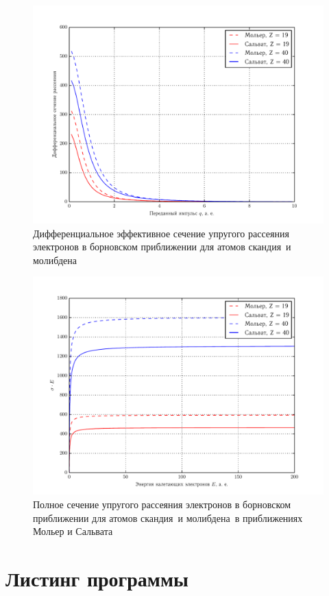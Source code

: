 \documentclass[10pt,pscyr]{hedlab}
\newcommand{\fiat}{скандия~}
\newcommand{\seat}{молибдена~}
\begin{document}
  \begin{figure}[h!]
    \centering
    \includegraphics[width=.7\textwidth]{diffsect}
    \caption{Дифференциальное эффективное сечение упругого
      рассеяния электронов в борновском приближении для атомов
      \fiat и \seat}
    \label{fig:diff}
  \end{figure}
  
  \begin{figure}[h!]
    \centering
    \includegraphics[width=.7\textwidth]{sect}
    \caption{Полное сечение упругого рассеяния электронов в
      борновском приближении для атомов \fiat и \seat в
      приближениях Мольер и Сальвата}
    \label{fig:sect}
  \end{figure}

  \clearpage
  \section{Листинг программы}
  \label{sec:code}  
  
  
\end{document}
